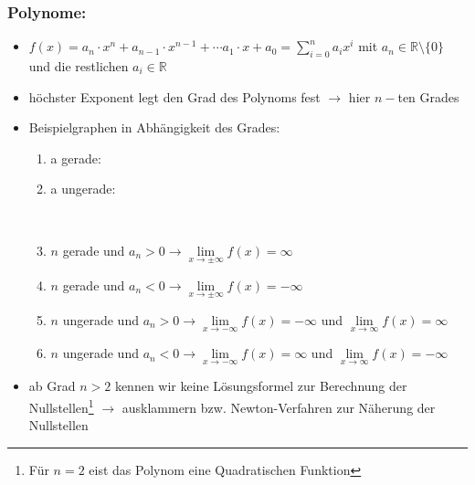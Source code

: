 \documentclass[a4paper,twocolumn,10pt]{onepgnote}
\begin{document}
\subsubsection{Polynome:}
\begin{itemize}
\item $f(x)= a_n\cdot x^n + a_{n-1} \cdot x^{n-1} + \cdots a_1 \cdot x + a_0 =\sum\limits_{i=0}^{n} a_i x^i$ mit $a_n\in \mathds{R}\setminus \{0\}$ und die restlichen $a_{i} \in \mathds{R}$
\item höchster Exponent legt den Grad des Polynoms fest $\longrightarrow$ hier $n-$ten Grades
\item Beispielgraphen in Abhängigkeit des Grades:\\
\begin{enumerate}\item a gerade: 
\item a ungerade: \\
\item $n$ gerade und $a_n > 0 \longrightarrow \lim\limits_{x \to \pm\infty} f(x) = \infty$\\
\item $n$ gerade und $a_n <0 \longrightarrow \lim\limits_{x \to \pm\infty} f(x) =- \infty$\\
\item $n$ ungerade und $a_n > 0 \longrightarrow \lim\limits_{x \to -\infty} f(x) = -\infty$ und $ \lim\limits_{x \to \infty} f(x) = \infty$\\
\item $n$ ungerade und $a_n < 0 \longrightarrow \lim\limits_{x \to -\infty} f(x) = \infty$ und $ \lim\limits_{x \to \infty} f(x) = -\infty$
\end{enumerate}
\item ab Grad $n>2$ kennen wir keine Lösungsformel zur Berechnung der Nullstellen\footnote{Für $n=2$ eist das Polynom eine Quadratischen Funktion} $\longrightarrow$ ausklammern bzw. Newton-Verfahren zur Näherung der Nullstellen
\end{itemize}
\end{document}
